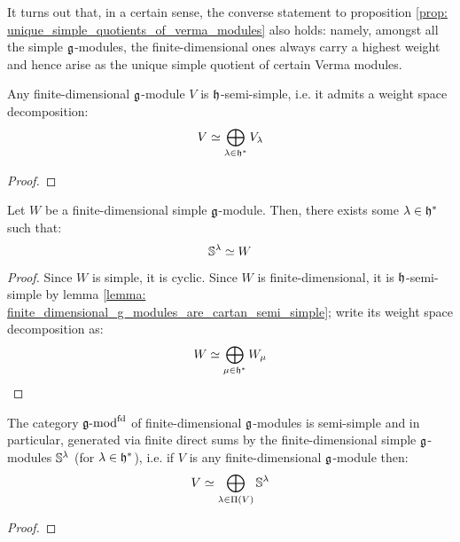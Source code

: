         It turns out that, in a certain sense, the converse statement to proposition \ref{prop: unique_simple_quotients_of_verma_modules} also holds: namely, amongst all the simple $\mathfrak{g}$-modules, the finite-dimensional ones always carry a highest weight and hence arise as the unique simple quotient of certain Verma modules.
        \begin{lemma} \label{lemma: finite_dimensional_g_modules_are_cartan_semi_simple}
            Any finite-dimensional $\mathfrak{g}$-module $V$ is $\mathfrak{h}$-semi-simple, i.e. it admits a weight space decomposition:
                $$V \simeq \bigoplus_{\lambda \in \mathfrak{h}^*} V_{\lambda}$$
        \end{lemma}
            \begin{proof}
                
            \end{proof}
        \begin{proposition} \label{prop: finite_dimensional_simple_g_modules_are_simple_quotients_of_verma_modules}
            Let $W$ be a finite-dimensional simple $\mathfrak{g}$-module. Then, there exists some $\lambda \in \mathfrak{h}^*$ such that:
                $$\mathbb{S}^{\lambda} \simeq W$$
        \end{proposition}
            \begin{proof}
                Since $W$ is simple, it is cyclic. Since $W$ is finite-dimensional, it is $\mathfrak{h}$-semi-simple by lemma \ref{lemma: finite_dimensional_g_modules_are_cartan_semi_simple}; write its weight space decomposition as:
                    $$W \simeq \bigoplus_{\mu \in \mathfrak{h}^*} W_{\mu}$$
            \end{proof}
        \begin{corollary} \label{corollary: weyl_semi_simplicity_theorem}
            The category $\mathfrak{g}\text{-}\mathrm{mod}^{\mathrm{fd}}$ of finite-dimensional $\mathfrak{g}$-modules is semi-simple and in particular, generated via finite direct sums by the finite-dimensional simple $\mathfrak{g}$-modules $\mathbb{S}^{\lambda}$ (for $\lambda \in \mathfrak{h}^*$), i.e. if $V$ is any finite-dimensional $\mathfrak{g}$-module then:
                $$V \simeq \bigoplus_{\lambda \in \Pi(V)} \mathbb{S}^{\lambda}$$
        \end{corollary}
            \begin{proof}
                
            \end{proof}

